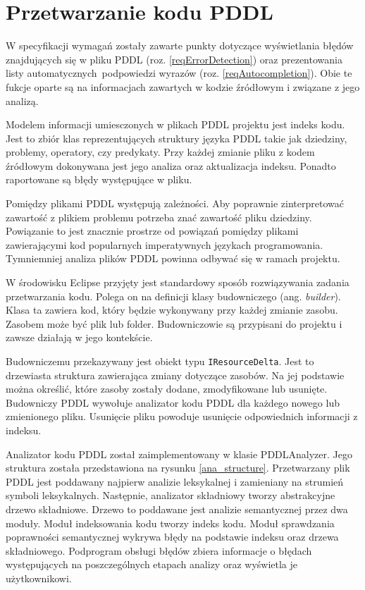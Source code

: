 \section{Przetwarzanie kodu PDDL}
\label{sec:przetwarzanie}
W specyfikacji wymagań zostały zawarte punkty dotyczące wyświetlania błędów znajdujących 
się w pliku PDDL (roz. \ref{reqErrorDetection}) oraz prezentowania listy automatycznych\
podpowiedzi wyrazów (roz. \ref{reqAutocompletion}).
Obie te fukcje oparte są na informacjach zawartych w kodzie źródłowym i związane
z jego analizą.

Modelem informacji umiesczonych w plikach PDDL projektu jest indeks kodu. Jest to
zbiór klas reprezentujących struktury języka PDDL takie jak dziedziny, problemy, operatory, czy predykaty.
Przy każdej zmianie pliku z kodem źródłowym dokonywana jest jego analiza oraz
aktualizacja indeksu. Ponadto raportowane są błędy występujące w pliku.

Pomiędzy plikami PDDL występują zależności. Aby poprawnie zinterpretować zawartość z plikiem
problemu potrzeba znać zawartość pliku dziedziny. Powiązanie to jest znacznie prostrze od 
powiązań pomiędzy plikami zawierającymi kod popularnych imperatywnych językach programowania.
Tymniemniej analiza plików PDDL powinna odbywać się w ramach projektu.

W środowisku Eclipse przyjęty jest standardowy sposób rozwiązywania zadania przetwarzania
kodu. Polega on na definicji klasy budowniczego (ang. \emph{builder}). Klasa ta
zawiera kod, który będzie wykonywany przy każdej zmianie zasobu. Zasobem
może być plik lub folder. Budowniczowie
są przypisani do projektu i zawsze działają w jego kontekście.

Budowniczemu przekazywany jest obiekt typu \texttt{IResourceDelta}. Jest to drzewiasta %
struktura zawierająca zmiany dotyczące zasobów. Na jej podstawie można określić, 
które zasoby zostały dodane, zmodyfikowane lub usunięte. Budowniczy PDDL wywołuje analizator
kodu PDDL dla każdego nowego lub zmienionego pliku. Usunięcie pliku powoduje usunięcie %
odpowiednich informacji z indeksu.


Analizator kodu PDDL został zaimplementowany w klasie PDDLAnalyzer.
Jego struktura została przedstawiona na rysunku \ref{ana_structure}.
Przetwarzany plik PDDL jest poddawany najpierw analizie leksykalnej i zamieniany
na strumień symboli leksykalnych. Następnie, analizator składniowy tworzy abstrakcyjne
drzewo składniowe. Drzewo to poddawane jest analizie semantycznej przez dwa moduły.
Moduł indeksowania kodu tworzy indeks kodu.
Moduł sprawdzania poprawności semantycznej wykrywa błędy na podstawie indeksu oraz
drzewa składniowego. Podprogram obsługi błędów zbiera informacje o błędach występujących
na poszczególnych etapach analizy oraz wyświetla je użytkownikowi.

